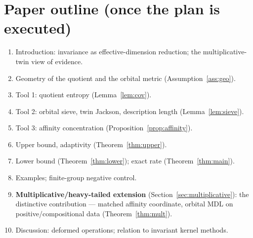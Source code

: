 \documentclass[11pt]{article}
\theoremstyle{plain}
\theoremstyle{definition}
\theoremstyle{remark}
\begin{document}
\section{Paper outline (once the plan is executed)}
\begin{enumerate}[label=\arabic*.]
\item Introduction: invariance as effective-dimension reduction; the
multiplicative-twin view of evidence.
\item Geometry of the quotient and the orbital metric (Assumption~\ref{ass:geo}).
\item Tool 1: quotient entropy (Lemma~\ref{lem:cov}).
\item Tool 2: orbital sieve, twin Jackson, description length (Lemma~\ref{lem:sieve}).
\item Tool 3: affinity concentration (Proposition~\ref{prop:affinity}).
\item Upper bound, adaptivity (Theorem~\ref{thm:upper}).
\item Lower bound (Theorem~\ref{thm:lower}); exact rate (Theorem~\ref{thm:main}).
\item Examples; finite-group negative control.
\item \textbf{Multiplicative/heavy-tailed extension} (Section~\ref{sec:multiplicative}):
the distinctive contribution --- matched affinity coordinate, orbital MDL on
positive/compositional data (Theorem~\ref{thm:mult}).
\item Discussion: deformed operations; relation to invariant kernel methods.
\end{enumerate}
\end{document}
